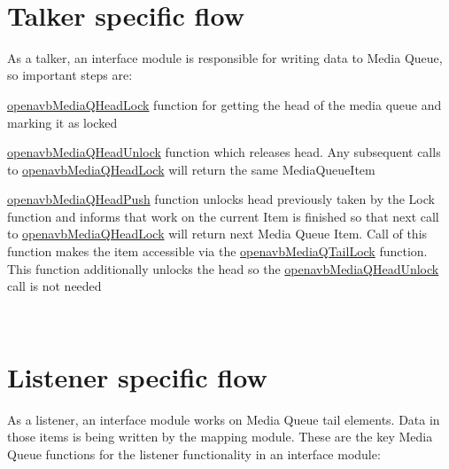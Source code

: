 ~\newline
\hypertarget{sdk_notes_media_queue_usage_media_queue_usage_talker}{}\section{Talker specific flow  }\label{sdk_notes_media_queue_usage_media_queue_usage_talker}
As a talker, an interface module is responsible for writing data to Media Queue, so important steps are\+:


\begin{DoxyItemize}
\item \hyperlink{mediaq_2openavb__mediaq__pub_8h_ae2ce807451447ec2dab9a4284ac61b99}{openavb\+Media\+Q\+Head\+Lock} function for getting the head of the media queue and marking it as locked
\item \hyperlink{mediaq_2openavb__mediaq__pub_8h_ac73b08d1568f13b634e2a0f1ef35e11a}{openavb\+Media\+Q\+Head\+Unlock} function which releases head. Any subsequent calls to \hyperlink{mediaq_2openavb__mediaq__pub_8h_ae2ce807451447ec2dab9a4284ac61b99}{openavb\+Media\+Q\+Head\+Lock} will return the same Media\+Queue\+Item
\item \hyperlink{mediaq_2openavb__mediaq__pub_8h_a0a57c275ac213fdd14c944741c6e9250}{openavb\+Media\+Q\+Head\+Push} function unlocks head previously taken by the Lock function and informs that work on the current Item is finished so that next call to \hyperlink{mediaq_2openavb__mediaq__pub_8h_ae2ce807451447ec2dab9a4284ac61b99}{openavb\+Media\+Q\+Head\+Lock} will return next Media Queue Item. Call of this function makes the item accessible via the \hyperlink{mediaq_2openavb__mediaq__pub_8h_aafa1645c7e234bd011a70063d368b995}{openavb\+Media\+Q\+Tail\+Lock} function. This function additionally unlocks the head so the \hyperlink{mediaq_2openavb__mediaq__pub_8h_ac73b08d1568f13b634e2a0f1ef35e11a}{openavb\+Media\+Q\+Head\+Unlock} call is not needed
\end{DoxyItemize}

~\newline
\hypertarget{sdk_notes_media_queue_usage_media_queue_usage_listener}{}\section{Listener specific flow    }\label{sdk_notes_media_queue_usage_media_queue_usage_listener}
As a listener, an interface module works on Media Queue tail elements. Data in those items is being written by the mapping module. These are the key Media Queue functions for the listener functionality in an interface module\+:



